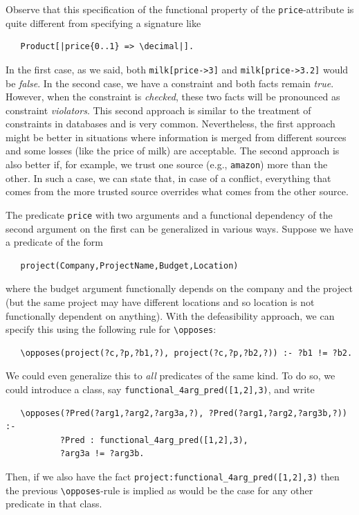\documentclass[11pt]{article}
\newcommand{\bs}{\textbackslash}
\begin{document}
Observe that this specification of the functional property of the
\texttt{price}-attribute is quite
different from specifying a signature like
\begin{verbatim}
   Product[|price{0..1} => \decimal|].
\end{verbatim}
In the first case, as we said, both \texttt{milk[price->3]} and
\texttt{milk[price->3.2]} would be \emph{false}. In the second case, we have a
constraint and both facts remain \emph{true}. However, when the constraint
is \emph{checked}, these two facts will be pronounced as constraint
\emph{violators}.  This second approach is similar to the treatment of
constraints in databases and is very common.
Nevertheless, the first approach might be
better in situations where information is merged from different
sources and some losses (like the price of milk) are acceptable. The second
approach is also better if, for example,
we trust one source (e.g., \texttt{amazon})  more than the
other. In such a case, we can state that, in case of a conflict,
everything that comes from the more trusted
source overrides what comes from the other source.

The predicate \texttt{price} with two arguments and a functional dependency
of the second argument on the first can be generalized in various ways.
Suppose we have a predicate of the form
\begin{verbatim}
   project(Company,ProjectName,Budget,Location) 
\end{verbatim}
where the budget argument
functionally depends on the company and the project (but the same project
may have different locations and so location is not functionally dependent on
anything). With the defeasibility approach, we can specify this using the
following rule for \texttt{\bs{}opposes}:
\begin{verbatim}
   \opposes(project(?c,?p,?b1,?), project(?c,?p,?b2,?)) :- ?b1 != ?b2.
\end{verbatim}
We could even generalize this to \emph{all} predicates of the same kind.
To do so, we could introduce a class, say
\texttt{functional\_4arg\_pred([1,2],3)},  and write
\begin{verbatim}
   \opposes(?Pred(?arg1,?arg2,?arg3a,?), ?Pred(?arg1,?arg2,?arg3b,?)) :-
           ?Pred : functional_4arg_pred([1,2],3),
           ?arg3a != ?arg3b.
\end{verbatim}
Then, if we also have the fact
\texttt{project:functional\_4arg\_pred([1,2],3)}  
then the previous \texttt{\bs{}opposes}-rule is implied as would be the
case for any other predicate in that  class.
\end{document}
